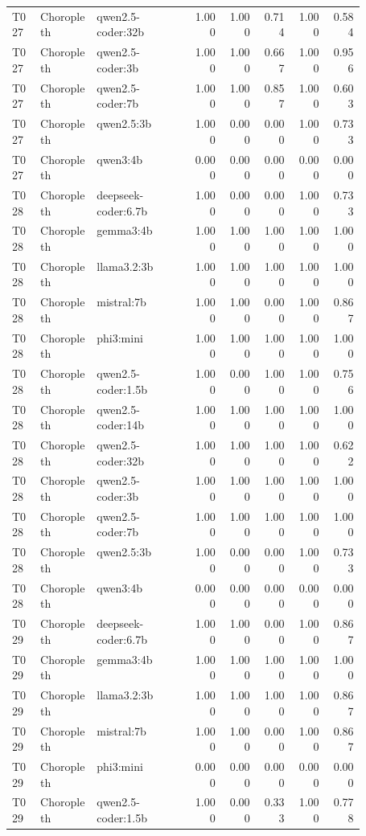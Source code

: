 \begin{longtable}{p{0.08\linewidth}p{0.16\linewidth}p{0.27\linewidth}rrrrr}
T027 & Choropleth & qwen2.5-coder:32b & 1.000 & 1.000 & 0.714 & 1.000 & 0.584 \\
T027 & Choropleth & qwen2.5-coder:3b & 1.000 & 1.000 & 0.667 & 1.000 & 0.956 \\
T027 & Choropleth & qwen2.5-coder:7b & 1.000 & 1.000 & 0.857 & 1.000 & 0.603 \\
T027 & Choropleth & qwen2.5:3b & 1.000 & 0.000 & 0.000 & 1.000 & 0.733 \\
T027 & Choropleth & qwen3:4b & 0.000 & 0.000 & 0.000 & 0.000 & 0.000 \\
T028 & Choropleth & deepseek-coder:6.7b & 1.000 & 0.000 & 0.000 & 1.000 & 0.733 \\
T028 & Choropleth & gemma3:4b & 1.000 & 1.000 & 1.000 & 1.000 & 1.000 \\
T028 & Choropleth & llama3.2:3b & 1.000 & 1.000 & 1.000 & 1.000 & 1.000 \\
T028 & Choropleth & mistral:7b & 1.000 & 1.000 & 0.000 & 1.000 & 0.867 \\
T028 & Choropleth & phi3:mini & 1.000 & 1.000 & 1.000 & 1.000 & 1.000 \\
T028 & Choropleth & qwen2.5-coder:1.5b & 1.000 & 0.000 & 1.000 & 1.000 & 0.756 \\
T028 & Choropleth & qwen2.5-coder:14b & 1.000 & 1.000 & 1.000 & 1.000 & 1.000 \\
T028 & Choropleth & qwen2.5-coder:32b & 1.000 & 1.000 & 1.000 & 1.000 & 0.622 \\
T028 & Choropleth & qwen2.5-coder:3b & 1.000 & 1.000 & 1.000 & 1.000 & 1.000 \\
T028 & Choropleth & qwen2.5-coder:7b & 1.000 & 1.000 & 1.000 & 1.000 & 1.000 \\
T028 & Choropleth & qwen2.5:3b & 1.000 & 0.000 & 0.000 & 1.000 & 0.733 \\
T028 & Choropleth & qwen3:4b & 0.000 & 0.000 & 0.000 & 0.000 & 0.000 \\
T029 & Choropleth & deepseek-coder:6.7b & 1.000 & 1.000 & 0.000 & 1.000 & 0.867 \\
T029 & Choropleth & gemma3:4b & 1.000 & 1.000 & 1.000 & 1.000 & 1.000 \\
T029 & Choropleth & llama3.2:3b & 1.000 & 1.000 & 1.000 & 1.000 & 0.867 \\
T029 & Choropleth & mistral:7b & 1.000 & 1.000 & 0.000 & 1.000 & 0.867 \\
T029 & Choropleth & phi3:mini & 0.000 & 0.000 & 0.000 & 0.000 & 0.000 \\
T029 & Choropleth & qwen2.5-coder:1.5b & 1.000 & 0.000 & 0.333 & 1.000 & 0.778 \\

\end{longtable}

